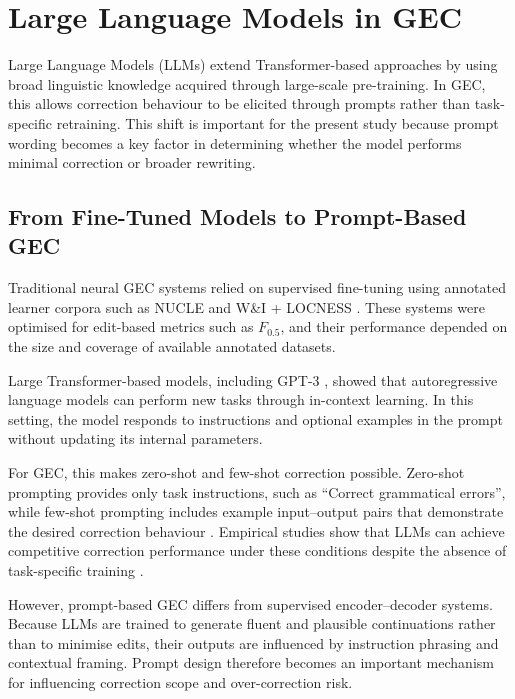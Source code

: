 \section{Large Language Models in GEC}

Large Language Models (LLMs) extend Transformer-based approaches by using broad linguistic knowledge acquired through large-scale pre-training. In GEC, this allows correction behaviour to be elicited through prompts rather than task-specific retraining. This shift is important for the present study because prompt wording becomes a key factor in determining whether the model performs minimal correction or broader rewriting.

\subsection{From Fine-Tuned Models to Prompt-Based GEC}

Traditional neural GEC systems relied on supervised fine-tuning using annotated learner corpora such as NUCLE and W\&I + LOCNESS \cite{ng-etal-2014-conll,bryant-etal-2019-bea}. These systems were optimised for edit-based metrics such as $F_{0.5}$, and their performance depended on the size and coverage of available annotated datasets.

Large Transformer-based models, including GPT-3 \cite{NEURIPS2020_1457c0d6}, showed that autoregressive language models can perform new tasks through in-context learning. In this setting, the model responds to instructions and optional examples in the prompt without updating its internal parameters.

For GEC, this makes zero-shot and few-shot correction possible. Zero-shot prompting provides only task instructions, such as ``Correct grammatical errors'', while few-shot prompting includes example input--output pairs that demonstrate the desired correction behaviour \cite{NEURIPS2020_1457c0d6}. Empirical studies show that LLMs can achieve competitive correction performance under these conditions despite the absence of task-specific training \cite{loem2023exploringeffectivenessgpt3grammatical}.

However, prompt-based GEC differs from supervised encoder--decoder systems. Because LLMs are trained to generate fluent and plausible continuations rather than to minimise edits, their outputs are influenced by instruction phrasing and contextual framing. Prompt design therefore becomes an important mechanism for influencing correction scope and over-correction risk.

